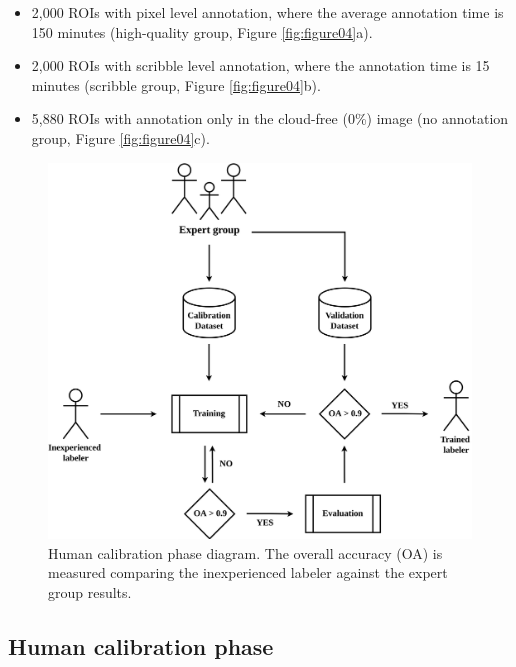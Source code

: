 \documentclass[a4paper, nobind]{templates/cdethesis}
\begin{document}
\begin{itemize}
    \item 2,000 ROIs with pixel level annotation, where the average annotation time is 150 minutes (high-quality group, Figure \ref{fig:figure04}a).
    \item 2,000 ROIs with scribble level annotation, where the annotation time is 15 minutes (scribble group, Figure \ref{fig:figure04}b).
    \item 5,880 ROIs with annotation only in the cloud-free (0\%) image (no annotation group, Figure \ref{fig:figure04}c).
\end{itemize}

\begin{figure}[!h]
    \centering
    \includegraphics[width=0.98\linewidth]{figures/chapter01/figure05.png}
    \caption{Human calibration phase diagram. The overall accuracy (OA) is measured comparing the inexperienced labeler against the expert group results.}
    \label{fig:figure05}
\end{figure}

\hypertarget{human-calibration-phase}{%
\subsection{Human calibration phase}\label{human-calibration-phase}}
\end{document}
